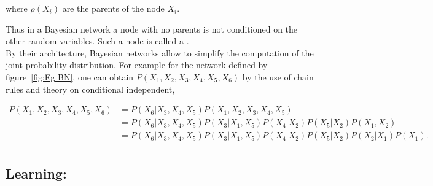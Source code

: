 \documentclass[a4paper,11pt]{report}
\begin{document}
{\begin{prop}
				where $\rho(X_{i})$ are the parents of the node $X_{i}$. 
				\label{pty:CI for BNs}
			\end{prop}
			
			Thus in a Bayesian network a node with no parents is not conditioned on the other random variables. Such a node is called a .\\

			By their architecture, Bayesian networks allow to simplify the computation of the joint probability distribution. For example for the network defined by figure~\ref{fig:Eg BN}, one can obtain $P(X_{1},X_{2},X_{3},X_{4},X_{5},X_{6})$ by the use of chain rules and theory on conditional independent,
			
			\begin{equation*}
			  \begin{split}
			    P(X_{1},X_{2},X_{3},X_{4},X_{5},X_{6})
						&= P(X_{6} | X_{3},X_{4},X_{5}) P(X_{1},X_{2},X_{3},X_{4},X_{5}) \\
						&= P(X_{6} | X_{3},X_{4},X_{5}) P(X_{3} | X_{1},X_{5}) P(X_{4}| X_{2}) P(X_{5}| X_{2}) P(X_{1},X_{2})\\
						&= P(X_{6} | X_{3},X_{4},X_{5}) P(X_{3} | X_{1},X_{5}) P(X_{4}| X_{2}) P(X_{5}| X_{2}) P(X_{2}|X_{1}) P(X_{1}).\\
			  \end{split}
			  \label{eq:Eg BN CI}
			\end{equation*}
      

    \subsection{Learning:}
      \label{subseq:PGMs/BN/Learning}
      
}
\end{document}
